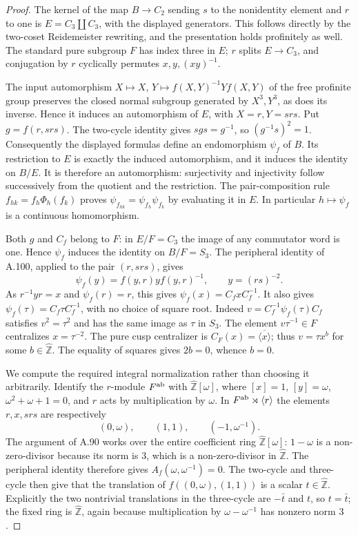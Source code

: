 \begin{proof}
The kernel of the map $B\to C_2$ sending $s$ to the nonidentity
element and $r$ to one is $E=C_3\amalg C_3$, with the displayed
generators. This follows directly by the two-coset Reidemeister
rewriting, and the presentation holds profinitely as well. The
standard pure subgroup $F$ has index three in $E$; $r$ splits
$E\to C_3$, and conjugation by $r$ cyclically permutes
$x,y,(xy)^{-1}$.

The input automorphism $X\mapsto X$, $Y\mapsto f(X,Y)^{-1}Yf(X,Y)$
of the free profinite group preserves the closed normal subgroup
generated by $X^3,Y^3$, as does its inverse. Hence it induces an
automorphism of $E$, with $X=r,Y=srs$. Put $g=f(r,srs)$.
The two-cycle identity gives $sgs=g^{-1}$, so $(g^{-1}s)^2=1$.
Consequently the displayed formulas define an endomorphism $\psi_f$
of $B$. Its restriction to $E$ is exactly the induced automorphism,
and it induces the identity on $B/E$. It is therefore an
automorphism: surjectivity and injectivity follow successively from
the quotient and the restriction. The pair-composition rule
$f_{hk}=f_h\Phi_h(f_k)$ proves
$\psi_{f_{hk}}=\psi_{f_h}\psi_{f_k}$ by evaluating it in $E$.
In particular $h\mapsto\psi_f$ is a continuous homomorphism.

Both $g$ and $C_f$ belong to $F$: in $E/F=C_3$ the image of any
commutator word is one. Hence $\psi_f$ induces the identity on
$B/F=S_3$. The peripheral identity of \textup{A.100}, applied to
the pair $(r,srs)$, gives
\[
 \psi_f(y)=f(y,r)y f(y,r)^{-1},
 \qquad y=(rs)^{-2}.
\]
As $r^{-1}yr=x$ and $\psi_f(r)=r$, this gives
$\psi_f(x)=C_fxC_f^{-1}$.
It also gives $\psi_f(\tau)=C_f\tau C_f^{-1}$, with no choice
of square root. Indeed $v=C_f^{-1}\psi_f(\tau)C_f$ satisfies
$v^2=\tau^2$ and has the same image as $\tau$ in $S_3$.
The element $v\tau^{-1}\in F$ centralizes $x=\tau^{-2}$.
The pure cusp centralizer is $C_F(x)=\overline{\langle x\rangle}$;
thus $v=\tau x^b$ for some $b\in\widehat{\mathbb Z}$.
The equality of squares gives $2b=0$, whence $b=0$.

We compute the required integral normalization rather than choosing
it arbitrarily. Identify the $r$-module $F^{\rm ab}$ with
$\widehat{\mathbb Z}[\omega]$, where $[x]=1$, $[y]=\omega$,
$\omega^2+\omega+1=0$, and $r$ acts by multiplication by $\omega$.
In $F^{\rm ab}\rtimes\langle r\rangle$ the elements $r,x,srs$
are respectively
\[
 (0,\omega),\qquad(1,1),\qquad(-1,\omega^{-1}).
\]
The argument of \textup{A.90} works over the entire coefficient
ring $\widehat{\mathbb Z}[\omega]$: $1-\omega$ is a non-zero-divisor
because its norm is $3$, which is a non-zero-divisor in
$\widehat{\mathbb Z}$. The peripheral identity therefore gives
$A_f(\omega,\omega^{-1})=0$. The two-cycle and three-cycle then
give that the translation of
$f((0,\omega),(1,1))$ is a scalar $t\in\widehat{\mathbb Z}$.
Explicitly the two nontrivial translations in the three-cycle are
$-\bar t$ and $t$, so $t=\bar t$; the fixed ring is
$\widehat{\mathbb Z}$, again because multiplication by
$\omega-\omega^{-1}$ has nonzero norm $3$.


\end{proof}
